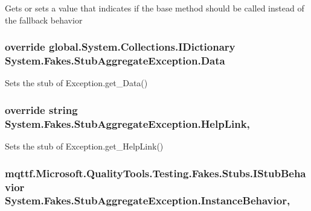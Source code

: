 Gets or sets a value that indicates if the base method should be called instead of the fallback behavior

\hypertarget{class_system_1_1_fakes_1_1_stub_aggregate_exception_aaa125112314588b7cd3816f9bc4b0ff8}{
\subsubsection[{Data}]{\setlength{\rightskip}{0pt plus 5cm}override global.\-System.\-Collections.\-I\-Dictionary System.\-Fakes.\-Stub\-Aggregate\-Exception.\-Data\hspace{0.3cm}{\ttfamily [get]}}}\label{class_system_1_1_fakes_1_1_stub_aggregate_exception_aaa125112314588b7cd3816f9bc4b0ff8}


Sets the stub of Exception.\-get\-\_\-\-Data()

\hypertarget{class_system_1_1_fakes_1_1_stub_aggregate_exception_ae30757b172df4b2f22c3b92ca77ac4d1}{
\subsubsection[{Help\-Link}]{\setlength{\rightskip}{0pt plus 5cm}override string System.\-Fakes.\-Stub\-Aggregate\-Exception.\-Help\-Link\hspace{0.3cm}{\ttfamily [get]}, {\ttfamily [set]}}}\label{class_system_1_1_fakes_1_1_stub_aggregate_exception_ae30757b172df4b2f22c3b92ca77ac4d1}


Sets the stub of Exception.\-get\-\_\-\-Help\-Link()

\hypertarget{class_system_1_1_fakes_1_1_stub_aggregate_exception_ae037eb6544ef740389aed7c56ae254fb}{
\subsubsection[{Instance\-Behavior}]{\setlength{\rightskip}{0pt plus 5cm}mqttf.\-Microsoft.\-Quality\-Tools.\-Testing.\-Fakes.\-Stubs.\-I\-Stub\-Behavior System.\-Fakes.\-Stub\-Aggregate\-Exception.\-Instance\-Behavior\hspace{0.3cm}{\ttfamily [get]}, {\ttfamily [set]}}}\label{class_system_1_1_fakes_1_1_stub_aggregate_exception_ae037eb6544ef740389aed7c56ae254fb}


